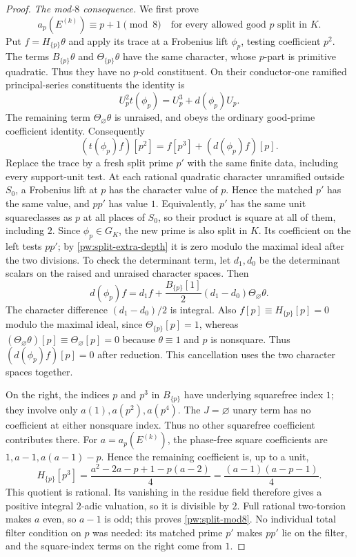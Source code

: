\begin{proof}
\smallskip\noindent\emph{The mod-$8$ consequence.}
We first prove
\begin{equation}\label{pw:split-mod8}
 a_p(E^{(k)})\equiv p+1\pmod8
 \quad\text{for every allowed good }p\text{ split in }K.
\end{equation}
Put $f=H_{\{p\}}\theta$ and apply its trace at a Frobenius lift $\phi_p$,
testing coefficient $p^2$.  The terms $B_{\{p\}}\theta$ and
$\Theta_{\{p\}}\theta$ have the same character, whose $p$-part is
primitive quadratic.  Thus they have no $p$-old constituent.  On their
conductor-one ramified principal-series constituents the identity is
\[
 U_p^2t(\phi_p)=U_p^3+d(\phi_p)U_p.
\]
The remaining term $\Theta_\varnothing\theta$ is unraised, and obeys the
ordinary good-prime coefficient identity.  Consequently
\[
 (t(\phi_p)f)[p^2]=f[p^3]+(d(\phi_p)f)[p].
\]
Replace the trace by a fresh split prime $p'$ with the same finite data,
including every support-unit test.  At each rational quadratic character
unramified outside $S_0$, a Frobenius lift at $p$ has the character value
of $p$.  Hence the matched $p'$ has the same value, and $pp'$ has value
$1$.  Equivalently, $p'$ has the same unit squareclasses as $p$ at all
places of $S_0$, so their product is square at all of them, including $2$.
Since $\phi_p\in G_K$, the new prime is also split in $K$.
Its coefficient on the left tests $pp'$; by
\eqref{pw:split-extra-depth} it is zero modulo the maximal ideal after
the two divisions.  To check the determinant term, let $d_1,d_0$ be the
determinant scalars on the raised and unraised character spaces.  Then
\[
 d(\phi_p)f
 =d_1f+\frac{B_{\{p\}}[1]}2(d_1-d_0)
                  \Theta_\varnothing\theta.
\]
The character difference $(d_1-d_0)/2$ is integral.  Also
$f[p]\equiv H_{\{p\}}[p]=0$ modulo the maximal ideal, since
$\Theta_{\{p\}}[p]=1$, whereas
$(\Theta_\varnothing\theta)[p]\equiv\Theta_\varnothing[p]=0$
because $\theta\equiv1$ and $p$ is nonsquare.  Thus
$(d(\phi_p)f)[p]=0$ after reduction.  This cancellation uses the two
character spaces together.

On the right, the indices $p$ and $p^3$ in $B_{\{p\}}$ have underlying
squarefree index $1$; they involve only $a(1),a(p^2),a(p^4)$.  The
$J=\varnothing$ unary term has no coefficient at either nonsquare
index.  Thus no other squarefree coefficient contributes there.
For $a=a_p(E^{(k)})$, the phase-free square coefficients are
$1,a-1,a(a-1)-p$.  Hence the remaining coefficient is, up to a unit,
\[
 H_{\{p\}}[p^3]
 =\frac{a^2-2a-p+1-p(a-2)}4
 =\frac{(a-1)(a-p-1)}4.
\]
This quotient is rational. Its vanishing in the residue field therefore
gives a positive integral $2$-adic valuation, so it is divisible by $2$.
Full rational two-torsion makes $a$ even, so
$a-1$ is odd; this proves \eqref{pw:split-mod8}.  No individual total
filter condition on $p$ was needed: its matched prime $p'$ makes $pp'$
lie on the filter, and the square-index terms on the right come from $1$.


\end{proof}
